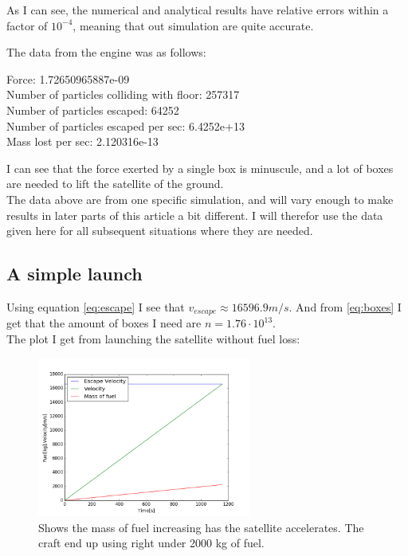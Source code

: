 \documentclass[a4paper, 10pt]{article}
\begin{document}
As I can see, the numerical and analytical results have relative errors within a factor of $10^{-4}$, meaning that out simulation are quite accurate.

The data from the engine was as follows:

\begin{tcolorbox}
Force:  1.72650965887e-09 \\
Number of particles colliding with floor:  257317 \\
Number of particles escaped:  64252 \\
Number of particles escaped per sec:  6.4252e+13 \\
Mass lost per sec:  2.120316e-13
\end{tcolorbox}

I can see that the force exerted by a single box is minuscule, and a lot of boxes are needed to lift the satellite of the ground. \\

The data above are from one specific simulation, and will vary enough to make results in later parts of this article a bit different. I will therefor use the data given here for all subsequent situations where they are needed.

\subsection{A simple launch}

Using equation \ref{eq:escape} I see that $v_{escape} \approx 16596.9 m/s$. And from \ref{eq:boxes} I get that the amount of boxes I need are $n = 1.76 \cdot 10^{13}$. \\

The plot I get from launching the satellite without fuel loss:


\begin{figure}[H]
\begin{center}
\includegraphics[width = 70mm]{part1launchConstMass.png}
\caption{Shows the mass of fuel increasing has the satellite accelerates. The craft end up using right under 2000 kg of fuel.}
\end{center}
\end{figure}
\end{document}
